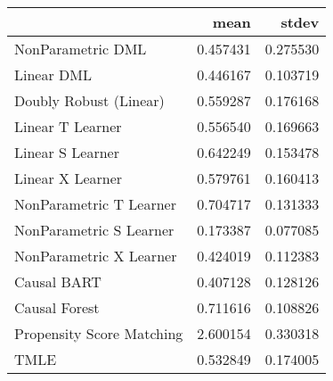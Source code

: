 \begin{tabular}{lrr}
\toprule
{} &      mean &     stdev \\
\midrule
NonParametric DML         &  0.457431 &  0.275530 \\
Linear DML                &  0.446167 &  0.103719 \\
Doubly Robust (Linear)    &  0.559287 &  0.176168 \\
Linear T Learner          &  0.556540 &  0.169663 \\
Linear S Learner          &  0.642249 &  0.153478 \\
Linear X Learner          &  0.579761 &  0.160413 \\
NonParametric T Learner   &  0.704717 &  0.131333 \\
NonParametric S Learner   &  0.173387 &  0.077085 \\
NonParametric X Learner   &  0.424019 &  0.112383 \\
Causal BART               &  0.407128 &  0.128126 \\
Causal Forest             &  0.711616 &  0.108826 \\
Propensity Score Matching &  2.600154 &  0.330318 \\
TMLE                      &  0.532849 &  0.174005 \\
\bottomrule
\end{tabular}
